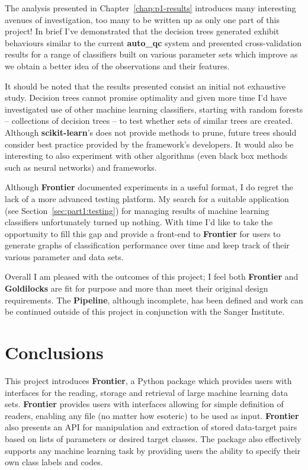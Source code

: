 The analysis presented in Chapter~\ref{chap:p1-results} introduces many
interesting avenues of investigation, too many to be written up as only one part
of this project! In brief I've demonstrated that the decision trees generated
exhibit behaviours similar to the current \textbf{auto\_qc} system and presented
cross-validation results for a range of classifiers built on various parameter
sets which improve as we obtain a better idea of the observations and their
features.

It should be noted that the results presented consist an initial not
exhaustive study. Decision trees cannot promise optimality and given more time
I'd have investigated use of other machine learning classifiers,
starting with random forests -- collections of decision trees -- to test whether
sets of similar trees are created. Although \textbf{scikit-learn}'s does not
provide methods to prune, future trees should consider best practice provided by
the framework's developers\citep{sl:tips}.
It would also be interesting to also experiment with other algorithms (even black
box methods such as neural networks) and frameworks.

Although \textbf{Frontier} documented experiments in a useful format, I do
regret the lack of a more advanced testing platform. My search for
a suitable application (see Section~\ref{sec:part1:testing}) for managing
results of machine learning classifiers unfortunately turned up nothing. With
time I'd like to take the opportunity to fill this gap and provide a front-end
to \textbf{Frontier} for users to generate graphs of classification performance
over time and keep track of their various parameter and data sets.

Overall I am pleased with the outcomes of this project; I feel both
\textbf{Frontier} and \textbf{Goldilocks} are fit for purpose and more than meet
their original design requirements. The \textbf{Pipeline}, although incomplete,
has been defined and work can be continued outside of this project in
conjunction with the Sanger Institute.


\chapter{Conclusions}

This project introduces \textbf{Frontier}, a Python package which provides users
with interfaces for the reading, storage and retrieval of large machine learning
data sets.  \textbf{Frontier} provides users with interfaces allowing for simple
definition of readers, enabling any file (no matter how esoteric) to be used as
input. \textbf{Frontier} also presents an API for manipulation and extraction of
stored data-target pairs based on lists of parameters or desired target classes.
The package also effectively supports any machine learning task by providing users
the ability to specify their own class labels and codes.

